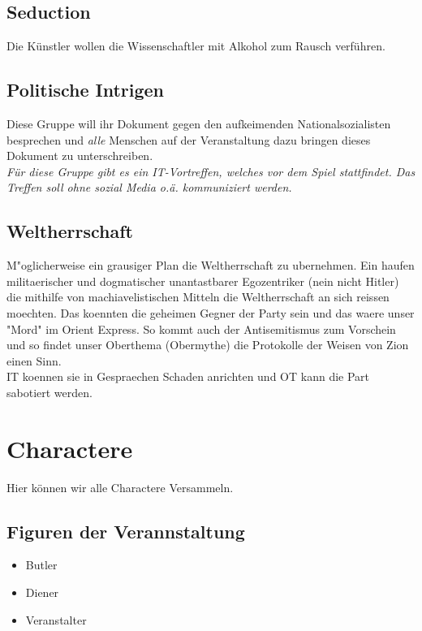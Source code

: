 \documentclass[12pt, a4paper, openany]{report}
\begin{document}
\section{Seduction}
Die Künstler wollen die Wissenschaftler mit Alkohol zum Rausch verführen. 

\section{Politische Intrigen}
Diese Gruppe will ihr Dokument gegen den aufkeimenden Nationalsozialisten besprechen und \emph{alle} Menschen auf der Veranstaltung dazu bringen dieses Dokument zu unterschreiben.\\

\emph{Für diese Gruppe gibt es ein IT-Vortreffen, welches vor dem Spiel stattfindet.
Das Treffen soll ohne sozial Media o.ä. kommuniziert werden.}

\section{Weltherrschaft}

M"oglicherweise ein grausiger Plan die Weltherrschaft zu ubernehmen. 
Ein haufen militaerischer und dogmatischer unantastbarer Egozentriker (nein nicht Hitler) die mithilfe von machiavelistischen Mitteln die Weltherrschaft an sich reissen moechten. 
Das koennten die geheimen Gegner der Party sein und das waere unser "Mord" im Orient Express. 
So kommt auch der Antisemitismus zum Vorschein und so findet unser Oberthema (Obermythe) die Protokolle der Weisen von Zion einen Sinn.\\
IT koennen sie in Gespraechen Schaden anrichten und OT kann die Part sabotiert werden. 


\chapter{Charactere}
Hier können wir alle Charactere Versammeln.

\section{Figuren der Verannstaltung}
\begin{itemize}
    \item Butler
    \item Diener
    \item Veranstalter
\end{itemize}
\end{document}
